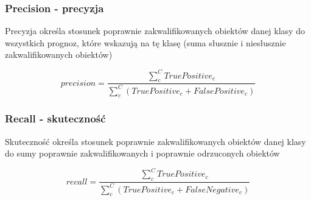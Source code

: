 \documentclass{classrep}
\begin{document}
\subsubsection{Precision - precyzja}
Precyzja określa stosunek poprawnie zakwalifikowanych obiektów danej klasy do wszystkich prognoz, które wskazują na tę klasę (suma słusznie i niesłusznie zakwalifikowanych obiektów)

\begin{equation}
precision = \frac{\sum_{c}^C{True Positive_c}}{\sum_{c}^C({True Positive_c + False Positive_c})}
\end{equation}

\subsubsection{Recall - skuteczność}
Skuteczność określa stosunek poprawnie zakwalifikowanych obiektów danej klasy do sumy poprawnie zakwalifikowanych i poprawnie odrzuconych obiektów 

\begin{equation}
recall = \frac{\sum_{c}^C{True Positive_c}}{\sum_{c}^C({True Positive_c + False Negative_c})}
\end{equation}
\end{document}
